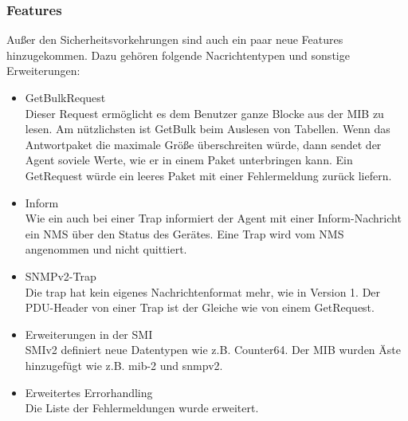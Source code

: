 \documentclass[11pt,a4paper]{article}
\begin{document}
\subsubsection{Features}
Außer den Sicherheitsvorkehrungen sind auch ein paar neue Features hinzugekommen. Dazu gehören folgende Nacrichtentypen und sonstige Erweiterungen:
\begin{itemize}
	\item 
		GetBulkRequest\\
		Dieser Request ermöglicht es dem Benutzer ganze Blocke aus der MIB zu lesen. Am nützlichsten ist GetBulk beim Auslesen von Tabellen. Wenn 				das Antwortpaket die maximale Größe überschreiten würde, dann sendet der Agent soviele Werte, wie er in einem Paket unterbringen kann. Ein 				GetRequest würde ein leeres Paket mit einer Fehlermeldung zurück liefern.
	\item
		Inform\\
		Wie ein auch bei einer Trap informiert der Agent mit einer Inform-Nachricht ein NMS über den Status des Gerätes. Eine Trap wird vom NMS 						angenommen und nicht quittiert.
	\item
		SNMPv2-Trap\\
		Die trap hat kein eigenes Nachrichtenformat mehr, wie in Version 1. Der PDU-Header von einer Trap ist der Gleiche wie von einem GetRequest.
	\item
		Erweiterungen in der SMI\\
		SMIv2 definiert neue Datentypen wie z.B. Counter64. Der MIB wurden Äste hinzugefügt wie z.B. mib-2 und snmpv2.
	\item
		Erweitertes Errorhandling\\
		Die Liste der Fehlermeldungen wurde erweitert.
\end{itemize}

\end{document}
